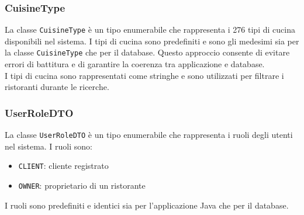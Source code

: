 \subsubsection{CuisineType}
\label{sec:cuisinetype}
La classe \texttt{CuisineType} è un tipo enumerabile che
rappresenta i 276 tipi di cucina disponibili nel sistema.
I tipi di cucina sono predefiniti e sono gli medesimi sia per 
la classe \texttt{CuisineType} che per il database.
Questo approccio consente di evitare errori di battitura e
di garantire la coerenza tra applicazione e database.\\
I tipi di cucina sono rappresentati come stringhe e sono
utilizzati per filtrare i ristoranti durante le ricerche.

\subsubsection{UserRoleDTO}
\label{sec:userroledto}
La classe \texttt{UserRoleDTO} è un tipo enumerabile che
rappresenta i ruoli degli utenti nel sistema.
I ruoli sono:
\begin{itemize}
    \item \texttt{CLIENT}: cliente registrato
    \item \texttt{OWNER}: proprietario di un ristorante
\end{itemize}
I ruoli sono predefiniti e identici sia per l'applicazione 
Java che per il database.

